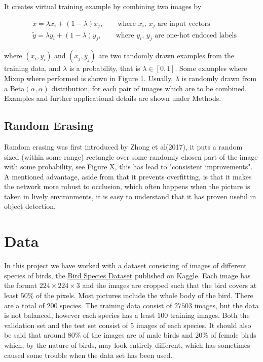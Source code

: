 \documentclass{article}
\begin{document}
It creates virtual training example by combining two images by 

\begin{align*}
&\tilde{x} = \lambda x_i + (1-\lambda) x_j, \qquad \text{where $x_i$, $x_j$ are input vectors} \\
&\tilde{y} = \lambda y_i + (1-\lambda) y_j, \qquad \text{where $y_i$, $y_j$ are one-hot endoced labels}
\end{align*}


where $(x_i, y_i)$ and $(x_j, y_j)$ are two randomly drawn examples from the training data, and $\lambda$ 
is a probability, that is $\lambda \in [0,1]$. Some examples where Mixup where performed is shown in Figure 1.  Usually, $\lambda$ is randomly drawn from a Beta$(\alpha, \alpha)$ 
distribution, for each pair of images which are to be combined. Examples and further applicational details are shown under Methods. 


\subsection{Random Erasing}
Random erasing was first introduced by Zhong et al(2017), it puts a random sized (within some range) rectangle over some randomly chosen part of the image with some probability, see Figure X, this has lead to "consistent improvements". A mentioned advantage, aside from that it prevents overfitting, is that it makes the network more robust to occlusion, which often happens when the picture is taken in lively environments, it is easy to understand that it has proven useful in object detection. 

\section{Data}

In this project we have worked with a dataset consisting of images of different species of birds, the  
\href{https://www.kaggle.com/gpiosenka/100-bird-species}{Bird Species Dataset} published on Kaggle. Each image has the format $224 \times 224 \times 3$ and the images are cropped such that the bird covers at least $50$\% of the pixels. Most pictures include the whole body of the bird.
There are 
a total of $200$ species. The training data consist of $27503$ images, but the data is not balanced, however each species has a least $100$ training images. 
Both the validation set and the test set consist of $5$ images of each species. 
It should also be said that around $80\%$ of the images are of male birds and $20\%$ of female 
birds which, by the nature of birds, may look entirely different, which has sometimes caused some trouble when the data set has been used.
\end{document}
